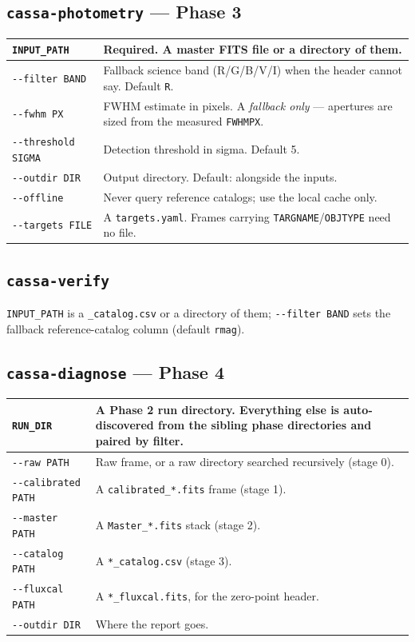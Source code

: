 \documentclass[11pt,a4paper]{article}
\begin{document}
\subsection{\texttt{cassa-photometry} --- Phase 3}
\begin{center}
\begin{tabularx}{\textwidth}{|l|X|}
\hline
\texttt{INPUT\_PATH} & \textbf{Required.} A master FITS file or a directory of them. \\
\hline
\texttt{-{}-filter BAND} & Fallback science band (R/G/B/V/I) when the header cannot say. Default \texttt{R}. \\
\hline
\texttt{-{}-fwhm PX} & FWHM estimate in pixels. A \emph{fallback only} --- apertures are sized from the measured \texttt{FWHMPX}. \\
\hline
\texttt{-{}-threshold SIGMA} & Detection threshold in sigma. Default 5. \\
\hline
\texttt{-{}-outdir DIR} & Output directory. Default: alongside the inputs. \\
\hline
\texttt{-{}-offline} & Never query reference catalogs; use the local cache only. \\
\hline
\texttt{-{}-targets FILE} & A \texttt{targets.yaml}. Frames carrying \texttt{TARGNAME}/\texttt{OBJTYPE} need no file. \\
\hline
\end{tabularx}
\end{center}

\subsection{\texttt{cassa-verify}}
\texttt{INPUT\_PATH} is a \texttt{\_catalog.csv} or a directory of them;
\texttt{-{}-filter BAND} sets the fallback reference-catalog column (default
\texttt{rmag}).

\subsection{\texttt{cassa-diagnose} --- Phase 4}
\begin{center}
\begin{tabularx}{\textwidth}{|l|X|}
\hline
\texttt{RUN\_DIR} & A Phase 2 run directory. Everything else is auto-discovered from the sibling phase directories and paired by filter. \\
\hline
\texttt{-{}-raw PATH} & Raw frame, or a raw directory searched recursively (stage 0). \\
\hline
\texttt{-{}-calibrated PATH} & A \texttt{calibrated\_*.fits} frame (stage 1). \\
\hline
\texttt{-{}-master PATH} & A \texttt{Master\_*.fits} stack (stage 2). \\
\hline
\texttt{-{}-catalog PATH} & A \texttt{*\_catalog.csv} (stage 3). \\
\hline
\texttt{-{}-fluxcal PATH} & A \texttt{*\_fluxcal.fits}, for the zero-point header. \\
\hline
\texttt{-{}-outdir DIR} & Where the report goes. \\
\hline
\end{tabularx}
\end{center}
\end{document}

